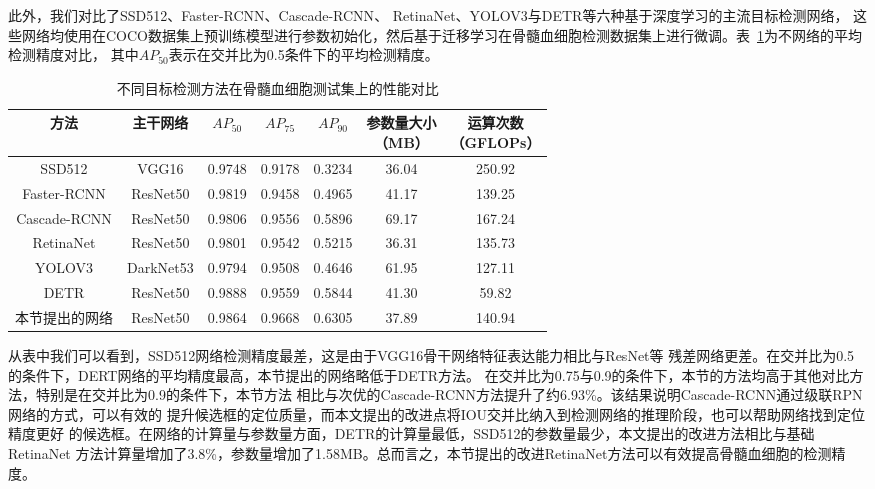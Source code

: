 此外，我们对比了SSD512\cite{liu2016ssd}、Faster-RCNN\cite{ren2015faster}、Cascade-RCNN\cite{cai2018cascade}、
RetinaNet\cite{lin2017focal}、YOLOV3\cite{redmon2018yolov3}与DETR\cite{zhu2020deformable}等六种基于深度学习的主流目标检测网络，
这些网络均使用在COCO数据集上预训练模型进行参数初始化，然后基于迁移学习在骨髓血细胞检测数据集上进行微调。表~\ref{table:cell_det_con}为不网络的平均检测精度对比，
其中$AP_{50}$表示在交并比为0.5条件下的平均检测精度。
\begin{table}
  \caption{不同目标检测方法在骨髓血细胞测试集上的性能对比}   
  \centering 
  \label{table:cell_det_con}
  \begin{tabular*}{0.90\hsize}{@{}@{\extracolsep{\fill}}ccccccc@{}}
    \toprule[1pt]
    方法 & 主干网络  &  $AP_{50}$ & $AP_{75}$ & $AP_{90}$ & \makecell{参数量大小\\（MB）} & \makecell{运算次数 \\（GFLOPs）} \\
    \midrule[1pt] 
    SSD512      & VGG16    & 0.9748 & 0.9178 & 0.3234 &  36.04 & 250.92 \\
    Faster-RCNN & ResNet50 & 0.9819 & 0.9458 & 0.4965 &  41.17 & 139.25 \\ 
    Cascade-RCNN & ResNet50 & 0.9806& 0.9556 & 0.5896 & 69.17 & 167.24   \\ 
    RetinaNet   & ResNet50 & 0.9801 & 0.9542 & 0.5215 &  36.31 & 135.73  \\ 
    YOLOV3      & DarkNet53 & 0.9794 & 0.9508 & 0.4646 & 61.95 & 127.11  \\ 
    DETR        & ResNet50 & 0.9888 &  0.9559 & 0.5844 &  41.30 & 59.82  \\ 
    本节提出的网络 & ResNet50 & 0.9864 & 0.9668 &  0.6305 & 37.89 & 140.94\\
    \hline
    \bottomrule[1pt]      
  \end{tabular*} 
\end{table}

从表中我们可以看到，SSD512网络检测精度最差，这是由于VGG16骨干网络特征表达能力相比与ResNet等
残差网络更差。在交并比为0.5的条件下，DERT网络的平均精度最高，本节提出的网络略低于DETR方法。
在交并比为0.75与0.9的条件下，本节的方法均高于其他对比方法，特别是在交并比为0.9的条件下，本节方法 
相比与次优的Cascade-RCNN方法提升了约6.93\%。该结果说明Cascade-RCNN通过级联RPN网络的方式，可以有效的
提升候选框的定位质量，而本文提出的改进点将IOU交并比纳入到检测网络的推理阶段，也可以帮助网络找到定位精度更好
的候选框。在网络的计算量与参数量方面，DETR的计算量最低，SSD512的参数量最少，本文提出的改进方法相比与基础RetinaNet
方法计算量增加了3.8\%，参数量增加了1.58MB。总而言之，本节提出的改进RetinaNet方法可以有效提高骨髓血细胞的检测精度。

